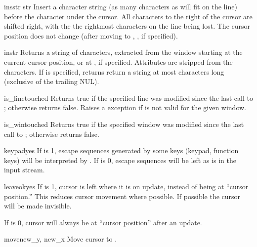 \begin{methoddesc}{insstr}{ str }
Insert a character string (as many characters as will fit on the line)
before the character under the cursor.  All characters to the right of
the cursor are shifted right, with the the rightmost characters on the
line being lost.  The cursor position does not change (after moving to
, , if specified). 
\end{methoddesc}

\begin{methoddesc}{instr}{ }
Returns a string of characters, extracted from the window starting at
the current cursor position, or at ,  if specified.
Attributes are stripped from the characters.  If  is specified,
 returns return a string at most  characters
long (exclusive of the trailing NUL).
\end{methoddesc}

\begin{methoddesc}{is_linetouched}{}
Returns true if the specified line was modified since the last call to
; otherwise returns false.  Raises a
 exception if  is not valid
for the given window.
\end{methoddesc}

\begin{methoddesc}{is_wintouched}{}
Returns true if the specified window was modified since the last call to
; otherwise returns false.
\end{methoddesc}

\begin{methoddesc}{keypad}{yes}
If  is 1, escape sequences generated by some keys (keypad, 
function keys) will be interpreted by .
If  is 0, escape sequences will be left as is in the input
stream.
\end{methoddesc}

\begin{methoddesc}{leaveok}{yes}
If  is 1, cursor is left where it is on update, instead of
being at ``cursor position.''  This reduces cursor movement where
possible. If possible the cursor will be made invisible.

If  is 0, cursor will always be at ``cursor position'' after
an update.
\end{methoddesc}

\begin{methoddesc}{move}{new_y, new_x}
Move cursor to .
\end{methoddesc}

